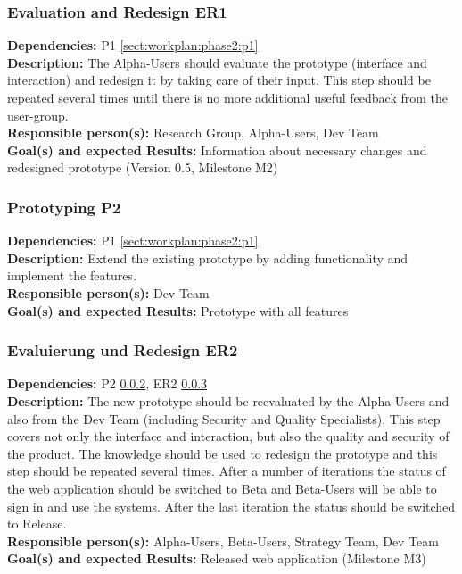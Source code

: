 \documentclass[a4paper,11pt]{article}
\begin{document}
\subsubsection{Evaluation and Redesign ER1}
\label{sect:workplan:phase2:er1}
\textbf{Dependencies:} P1 \ref{sect:workplan:phase2:p1}\\
\textbf{Description:} The Alpha-Users should evaluate the prototype (interface and interaction) and redesign it by taking care of their input. This step should be repeated several times until there is no more additional useful feedback from the user-group.\\
\textbf{Responsible person(s):} Research Group, Alpha-Users, Dev Team\\
\textbf{Goal(s) and expected Results:} Information about necessary changes and redesigned prototype (Version 0.5, Milestone M2)\\

\subsubsection{Prototyping P2}
\label{sect:workplan:phase2:p2}
\textbf{Dependencies:} P1 \ref{sect:workplan:phase2:p1}\\
\textbf{Description:} Extend the existing prototype by adding functionality and implement the features.\\
\textbf{Responsible person(s):} Dev Team\\
\textbf{Goal(s) and expected Results:} Prototype with all features\\

\pagebreak
\subsubsection{Evaluierung und Redesign ER2}
\label{sect:workplan:phase2:er2}
\textbf{Dependencies:} P2 \ref{sect:workplan:phase2:p2}, ER2 \ref{sect:workplan:phase2:er2}\\
\textbf{Description:} The new prototype should be reevaluated by the Alpha-Users and also from the Dev Team (including Security and Quality Specialists). This step covers not only the interface and interaction, but also the quality and security of the product. The knowledge should be used to redesign the prototype and this step should be repeated several times. After a number of iterations the status of the web application should be switched to Beta and Beta-Users will be able to sign in and use the systems. After the last iteration the status should be switched to Release.\\
\textbf{Responsible person(s):} Alpha-Users, Beta-Users, Strategy Team, Dev Team\\
\textbf{Goal(s) and expected Results:} Released web application (Milestone M3)\\
\end{document}
